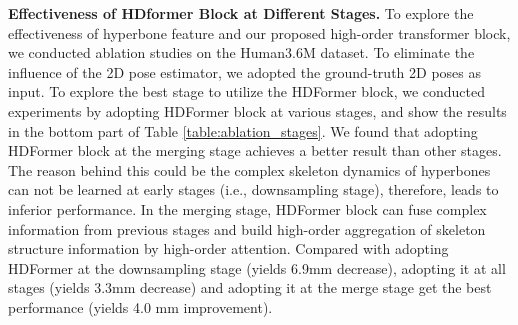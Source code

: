 \documentclass{article}
\begin{document}
\begin{table}
    \centering
    \scriptsize
    \caption{\small Ablation study of the effectiveness of HDFormer at different stages. We compared the results of the baseline (UGCN~\protect\cite{wang2020-motion}), our HDFormer, and different configurations for our HDFormer on Human3.6M. The $\Delta$ denotes the improvements compared with the baseline.}
    \label{table:ablation_stages}
\end{table}

\noindent \textbf{Effectiveness of HDformer Block at Different Stages.} To explore the effectiveness of hyperbone feature and our proposed high-order transformer block, we conducted ablation studies on the Human3.6M dataset. To eliminate the influence of the 2D pose estimator, we adopted the ground-truth 2D poses as input. To explore the best stage to utilize the HDFormer block, we conducted experiments by adopting HDFormer block at various stages, and show the results in the bottom part of Table \ref{table:ablation_stages}. We found that adopting HDFormer block at the merging stage achieves a better result than other stages. The reason behind this could be the complex skeleton dynamics of hyperbones can not be learned at early stages (i.e., downsampling stage), therefore, leads to inferior performance. In the merging stage, HDFormer block can fuse complex information from previous stages and build high-order aggregation of skeleton structure information by high-order attention. Compared with adopting HDFormer at the downsampling stage (yields 6.9mm decrease), adopting it at all stages (yields 3.3mm decrease) and adopting it at the merge stage get the best performance (yields 4.0 mm improvement).
\end{document}
